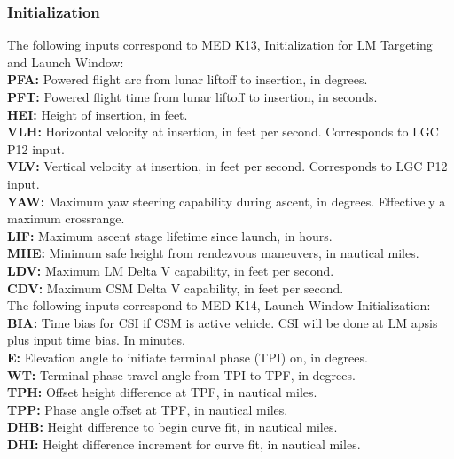 \documentclass[11pt]{article} %
\begin{document}
\subsubsection{Initialization}
The following inputs correspond to MED K13, Initialization for LM Targeting and Launch Window:\\

\textbf{PFA:} Powered flight arc from lunar liftoff to insertion, in degrees.\\
\textbf{PFT:} Powered flight time from lunar liftoff to insertion, in seconds.\\
\textbf{HEI:} Height of insertion, in feet.\\
\textbf{VLH:} Horizontal velocity at insertion, in feet per second. Corresponds to LGC P12 input.\\
\textbf{VLV:} Vertical velocity at insertion, in feet per second. Corresponds to LGC P12 input.\\
\textbf{YAW:} Maximum yaw steering capability during ascent, in degrees. Effectively a maximum crossrange.\\

\textbf{LIF:} Maximum ascent stage lifetime since launch, in hours.\\
\textbf{MHE:} Minimum safe height from rendezvous maneuvers, in nautical miles.\\
\textbf{LDV:} Maximum LM Delta V capability, in feet per second.\\
\textbf{CDV:} Maximum CSM Delta V capability, in feet per second.\\

The following inputs correspond to MED K14, Launch Window Initialization:\\

\textbf{BIA:} Time bias for CSI if CSM is active vehicle. CSI will be done at LM apsis plus input time bias. In minutes.\\
\textbf{E:} Elevation angle to initiate terminal phase (TPI) on, in degrees.\\
\textbf{WT:} Terminal phase travel angle from TPI to TPF, in degrees.\\ 
\textbf{TPH:} Offset height difference at TPF, in nautical miles.\\
\textbf{TPP:} Phase angle offset at TPF, in nautical miles.\\

\textbf{DHB:} Height difference to begin curve fit, in nautical miles.\\
\textbf{DHI:} Height difference increment for curve fit, in nautical miles.\\
\newpage
\end{document}

